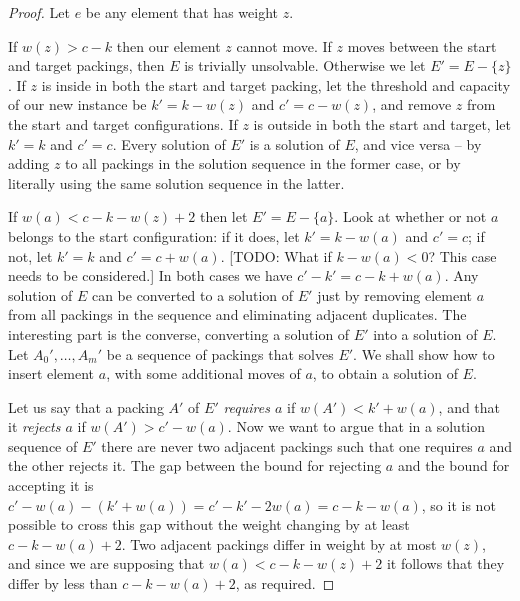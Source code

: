\documentclass{robinminion}
\begin{document}
\begin{proof}
    Let $e$ be any element that has weight $z$.
    
    If $w(z) > c - k$ then our element $z$ cannot move. If $z$ moves between the start and target packings, then $E$ is trivially unsolvable. Otherwise we let $E' = E-\{z\}$. If $z$ is inside in both the start and target packing, let the threshold and capacity of our new instance be $k' = k-w(z)$ and $c' = c-w(z)$, and remove $z$ from the start and target configurations. If $z$ is outside in both the start and target, let $k'=k$ and $c'=c$. Every solution of $E'$ is a solution of $E$, and vice versa -- by adding $z$ to all packings in the solution sequence in the former case, or by literally using the same solution sequence in the latter.
    
    If $w(a) < c-k-w(z) + 2$ then let $E' = E-\{a\}$. Look at whether or not $a$ belongs to the start configuration: if it does, let $k'=k-w(a)$ and $c'=c$; if not, let $k'=k$ and $c'=c+w(a)$. [TODO: What if $k-w(a) < 0$? This case needs to be considered.] In both cases we have $c'-k' = c-k+w(a)$. Any solution of $E$ can be converted to a solution of $E'$ just by removing element $a$ from all packings in the sequence and eliminating adjacent duplicates. The interesting part is the converse, converting a solution of $E'$ into a solution of $E$. Let $A_0', \dots, A_m'$ be a sequence of packings that solves $E'$. We shall show how to insert element $a$, with some additional moves of $a$, to obtain a solution of $E$.
    
    Let us say that a packing $A'$ of $E'$ \textit{requires $a$} if $w(A') < k' + w(a)$, and that it \textit{rejects $a$} if $w(A') > c' - w(a)$. Now we want to argue that in a solution sequence of $E'$ there are never two adjacent packings such that one requires $a$ and the other rejects it. The gap between the bound for rejecting $a$ and the bound for accepting it is $c' - w(a) - (k' + w(a)) = c'-k'-2w(a) = c-k-w(a)$, so it is not possible to cross this gap without the weight changing by at least $c-k-w(a)+2$. Two adjacent packings differ in weight by at most $w(z)$, and since we are supposing that $w(a) < c-k-w(z) + 2$ it follows that they differ by less than $c-k-w(a)+2$, as required.
    

\end{proof}
\end{document}
